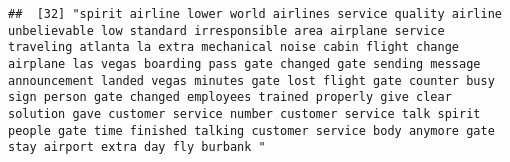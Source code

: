 \documentclass[
]{article}
\begin{document}
\begin{verbatim}
##  [32] "spirit airline lower world airlines service quality airline unbelievable low standard irresponsible area airplane service traveling atlanta la extra mechanical noise cabin flight change airplane las vegas boarding pass gate changed gate sending message announcement landed vegas minutes gate lost flight gate counter busy sign person gate changed employees trained properly give clear solution gave customer service number customer service talk spirit people gate time finished talking customer service body anymore gate stay airport extra day fly burbank "                                                                                                                                                                                                                                                                                                                                                                                                                                                                                                                                                                                                                                                                                                                                                                                                                                                                                                                                                                                                                                                                                                                                                                                                                  

\end{verbatim}
\end{document}
